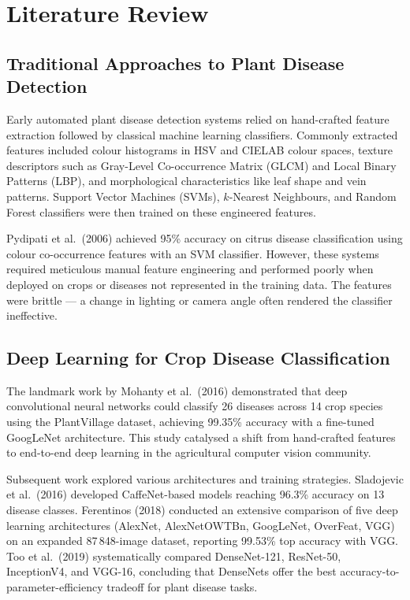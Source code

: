 \section{Literature Review}

\subsection{Traditional Approaches to Plant Disease Detection}

Early automated plant disease detection systems relied on hand-crafted
feature extraction followed by classical machine learning classifiers.
Commonly extracted features included colour histograms in HSV and CIELAB
colour spaces, texture descriptors such as Gray-Level Co-occurrence Matrix
(GLCM) and Local Binary Patterns (LBP), and morphological characteristics
like leaf shape and vein patterns. Support Vector Machines (SVMs),
$k$-Nearest Neighbours, and Random Forest classifiers were then trained on
these engineered features.

\parsp
Pydipati et al.\ (2006) achieved 95\% accuracy on citrus disease
classification using colour co-occurrence features with an SVM classifier.
However, these systems required meticulous manual feature engineering and
performed poorly when deployed on crops or diseases not represented in the
training data. The features were brittle — a change in lighting or camera
angle often rendered the classifier ineffective.

\subsection{Deep Learning for Crop Disease Classification}

The landmark work by Mohanty et al.\ (2016) demonstrated that deep
convolutional neural networks could classify 26 diseases across 14 crop
species using the PlantVillage dataset, achieving 99.35\% accuracy with a
fine-tuned GoogLeNet architecture. This study catalysed a shift from
hand-crafted features to end-to-end deep learning in the agricultural
computer vision community.

\parsp
Subsequent work explored various architectures and training strategies.
Sladojevic et al.\ (2016) developed CaffeNet-based models reaching 96.3\%
accuracy on 13 disease classes. Ferentinos (2018) conducted an extensive
comparison of five deep learning architectures (AlexNet, AlexNetOWTBn,
GoogLeNet, OverFeat, VGG) on an expanded 87\,848-image dataset, reporting
99.53\% top accuracy with VGG. Too et al.\ (2019) systematically compared
DenseNet-121, ResNet-50, InceptionV4, and VGG-16, concluding that DenseNets
offer the best accuracy-to-parameter-efficiency tradeoff for plant disease
tasks.


